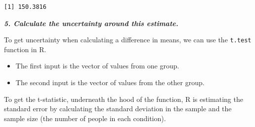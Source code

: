 \documentclass[
  letterpaper,
  DIV=11,
  numbers=noendperiod]{scrreprt}
\newenvironment{Shaded}{\begin{snugshade}}{\end{snugshade}}
\newcommand{\AttributeTok}[1]{\textcolor[rgb]{0.40,0.45,0.13}{#1}}
\newcommand{\DecValTok}[1]{\textcolor[rgb]{0.68,0.00,0.00}{#1}}
\newcommand{\DocumentationTok}[1]{\textcolor[rgb]{0.37,0.37,0.37}{\textit{#1}}}
\newcommand{\FunctionTok}[1]{\textcolor[rgb]{0.28,0.35,0.67}{#1}}
\newcommand{\NormalTok}[1]{\textcolor[rgb]{0.00,0.23,0.31}{#1}}
\newcommand{\OtherTok}[1]{\textcolor[rgb]{0.00,0.23,0.31}{#1}}
\newcommand{\SpecialCharTok}[1]{\textcolor[rgb]{0.37,0.37,0.37}{#1}}
\providecommand{\tightlist}{%
  \setlength{\itemsep}{0pt}\setlength{\parskip}{0pt}}\usepackage{longtable,booktabs,array}
\begin{document}
\begin{Shaded}
\end{Shaded}

\begin{verbatim}
[1] 150.3816
\end{verbatim}

\textbf{\emph{5. Calculate the uncertainty around this estimate.}}

To get uncertainty when calculating a difference in means, we can use
the \texttt{t.test} function in R.

\begin{itemize}
\tightlist
\item
  The first input is the vector of values from one group.
\item
  The second input is the vector of values from the other group.
\end{itemize}

To get the t-statistic, underneath the hood of the function, R is
estimating the standard error by calculating the standard deviation in
the sample and the sample size (the number of people in each condition).

\begin{Shaded}
\end{Shaded}
\end{document}
